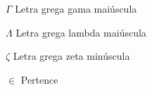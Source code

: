 %
%
%

\begin{simbolos}

\item[$ \Gamma $] Letra grega gama maiúscula
\item[$ \Lambda $] Letra grega lambda maiúscula
\item[$ \zeta $] Letra grega zeta minúscula
\item[$ \in $] Pertence

\end{simbolos}

